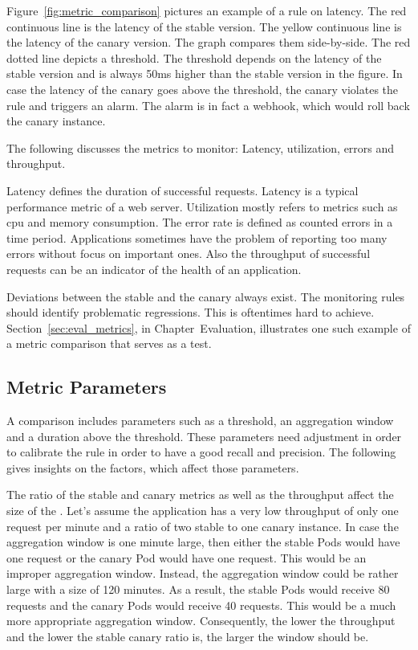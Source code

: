 Figure~\ref{fig:metric_comparison} pictures an example of a rule on latency. The red
continuous line is the latency of the stable version. The yellow continuous line is the
latency of the canary version. The graph compares them side-by-side. The red dotted line
depicts a threshold. The threshold depends on the latency of the stable version and is
always 50ms higher than the stable version in the figure. In case the latency of the
canary goes above the threshold, the canary violates the rule and triggers an alarm. The
alarm is in fact a webhook, which would roll back the canary instance.

The following discusses the metrics to monitor: Latency, utilization, errors and throughput.

Latency defines the duration of successful requests. Latency is a typical performance
metric of a web server. Utilization mostly refers to metrics such as \gls{cpu} and memory
consumption. The error rate is defined as counted errors in a time period. Applications
sometimes have the problem of reporting too many errors without focus on important
ones. Also the throughput of successful requests can be an indicator of the health of an
application.

Deviations between the stable and the canary always exist. The monitoring rules should
identify problematic regressions. This is oftentimes hard to
achieve. Section~\ref{sec:eval_metrics}, in Chapter~Evaluation, illustrates one such
example of a metric comparison that serves as a test.

\subsection{Metric Parameters}

A comparison includes parameters such as a threshold, an aggregation window and a duration
above the threshold. These parameters need adjustment in order to calibrate the rule in order to
have a good recall and precision. The following gives insights on the factors, which
affect those parameters.

The ratio of the stable and canary metrics as well as the throughput affect the size of
the . Let's assume the application has a very low throughput of
only one request per minute and a ratio of two stable to one canary instance. In case the
aggregation window is one minute large, then either the stable Pods would have one request or
the canary Pod would have one request. This would be an improper aggregation window. Instead,
the aggregation window could be rather large with a size of 120 minutes. As a result, the
stable Pods would receive 80 requests and the canary Pods would receive 40 requests. This
would be a much more appropriate aggregation window. Consequently, the lower the throughput
and the lower the stable canary ratio is, the larger the window should be.

